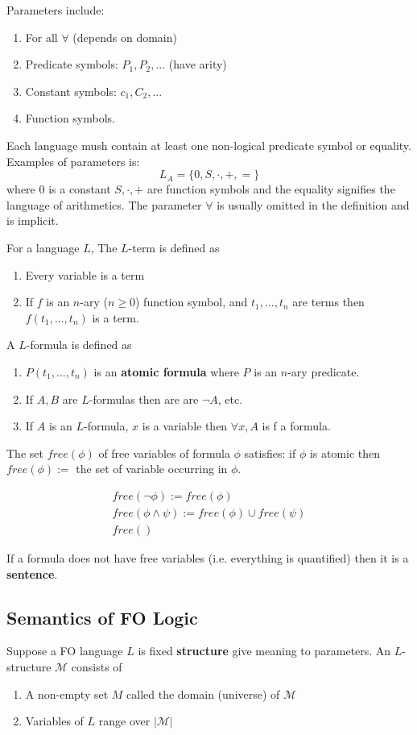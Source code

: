 \documentclass[twoside]{article}
\begin{document}
Parameters include:
\begin{enumerate}
\item For all $\forall$ (depends on domain)
\item Predicate symbols: $P_1, P_2, ...$ (have arity)
\item Constant symbols: $c_1, C_2, ...$
\item Function symbols.
\end{enumerate}
Each language mush contain at least one non-logical predicate symbol or equality. Examples of parameters is:
\[L_A = \{0, S, \cdot, +, =\}\]
where $0$ is a constant $S, \cdot, + $ are function symbols and the equality signifies the language of arithmetics. The parameter $\forall$ is usually omitted in the definition and is implicit.

For a language $L$, The $L$-term is defined as
\begin{enumerate}
\item Every variable is a term
\item If $f$ is an $n$-ary ($n\geq 0$) function symbol, and $t_1, ..., t_n$ are terms then $f(t_1, ..., t_n)$ is a term. 
\end{enumerate}

A $L$-formula is defined as
\begin{enumerate}
\item $P(t_1, ..., t_n)$ is an \textbf{atomic formula} where $P$ is an $n$-ary predicate.
\item If $A, B$ are $L$-formulas then are are $\lnot A$, etc.
\item If $A$ is an $L$-formula, $x$ is a variable then $\forall x, A$ is f a formula.
\end{enumerate}
The set $free(\phi)$ of free variables of formula $\phi$ satisfies: if $\phi$ is atomic then $free(\phi) :=$ the set of variable occurring in $\phi$. 

\begin{align*}
free(\lnot \phi) := free(\phi) \\
free(\phi \land \psi) := free(\phi) \cup free(\psi) \\
free()
\end{align*}

If a formula does not have free variables (i.e. everything is quantified) then it is a \textbf{sentence}. 

\subsection{Semantics of FO Logic}
Suppose a FO language $L$ is fixed \textbf{structure} give meaning to parameters. An $L$-structure $\mathcal{M}$ consists of 
\begin{enumerate}
\item A non-empty set $M$ called the domain (universe) of $\mathcal{M}$
\item Variables of $L$ range over $|\mathcal{M}|$
\end{enumerate}
\end{document}
